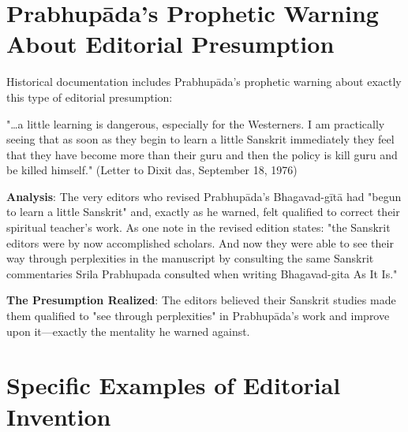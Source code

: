 \documentclass[11pt,twoside]{book}
\begin{document}
\section*{Prabhupāda's Prophetic Warning About Editorial Presumption}
\label{sec:org766b3a2}

Historical documentation includes Prabhupāda's prophetic warning about exactly this type of editorial presumption:

"\ldots{}a little learning is dangerous, especially for the Westerners. I am practically seeing that as soon as they begin to learn a little Sanskrit immediately they feel that they have become more than their guru and then the policy is kill guru and be killed himself." (Letter to Dixit das, September 18, 1976)

\textbf{\textbf{Analysis}}: The very editors who revised Prabhupāda's Bhagavad-gītā had "begun to learn a little Sanskrit" and, exactly as he warned, felt qualified to correct their spiritual teacher's work. As one note in the revised edition states: "the Sanskrit editors were by now accomplished scholars. And now they were able to see their way through perplexities in the manuscript by consulting the same Sanskrit commentaries Srila Prabhupada consulted when writing Bhagavad-gita As It Is."

\textbf{\textbf{The Presumption Realized}}: The editors believed their Sanskrit studies made them qualified to "see through perplexities" in Prabhupāda's work and improve upon it—exactly the mentality he warned against.
\section*{Specific Examples of Editorial Invention}
\label{sec:orgc9a5a5c}
\end{document}
